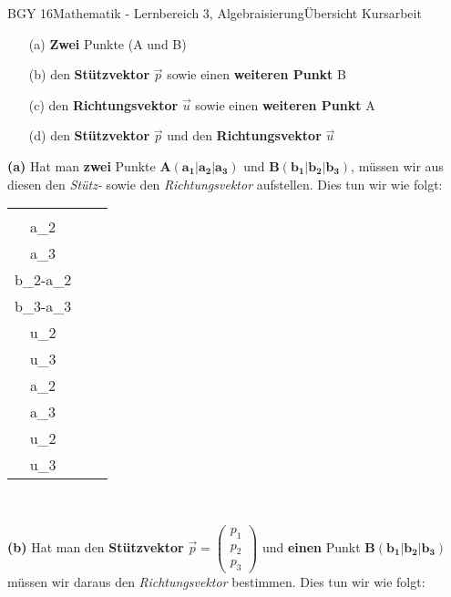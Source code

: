 \documentclass[oneside,openany,headings=optiontotoc,11pt,numbers=noenddot]{scrreprt}
\begin{document}
\begin{worksheet}{BGY 16}{Mathematik - Lernbereich 3, Algebraisierung}{Übersicht Kursarbeit}
\begin{framed}
			\begin{itemize}
				\item[\tiny{(a)}] \textbf{Zwei} Punkte (A und B)
				\item[\tiny{(b)}] den \textbf{Stützvektor} \(\vec{p}\) sowie einen \textbf{weiteren Punkt} B
				\item[\tiny{(c)}] den \textbf{Richtungsvektor} \(\vec{u}\) sowie einen \textbf{weiteren Punkt} A
				\item[\tiny{(d)}] den \textbf{Stützvektor} \(\vec{p}\) und den \textbf{Richtungsvektor} \(\vec{u}\)
			\end{itemize}
			\textbf{(a)} Hat man \textbf{zwei} Punkte \(\mathbf{A (a_1|a_2|a_3)}\) und \(\mathbf{B (b_1|b_2|b_3)}\), müssen wir aus diesen den \textit{Stütz-} sowie den \textit{Richtungsvektor} aufstellen. Dies tun wir wie folgt:\\
			\par\noindent
			\begin{tabularx}{\textwidth}{ccc}
				\(\vec{p} = \underbrace{\left(\begin{array}{c}a_1\\a_2\\a_3\end{array}\right)}_{Stützvektor}\) & \(\vec{u} = \left(\begin{array}{c}b_1-a_1\\b_2-a_2\\b_3-a_3\end{array}\right) = \underbrace{\left(\begin{array}{c}u_1\\u_2\\u_3\end{array}\right)}_{Richtungsvektor}\) & \(\Rightarrow \mathbf{g:} \vec{x} \mathbf{= \left(\begin{array}{c}a_1\\a_2\\a_3\end{array}\right) + r*\left(\begin{array}{c}u_1\\u_2\\u_3\end{array}\right)}\)
			\end{tabularx}\\
			\par\bigskip\noindent
			\textbf{(b)} Hat man den \textbf{Stützvektor} \(\vec{p} = \left(\begin{array}{c}p_1\\p_2\\p_3\end{array}\right)\) und \textbf{einen} Punkt \(\mathbf{B (b_1|b_2|b_3)}\) müssen wir daraus den \textit{Richtungsvektor} bestimmen. Dies tun wir wie folgt:\\

\end{framed}
\end{worksheet}
\end{document}
